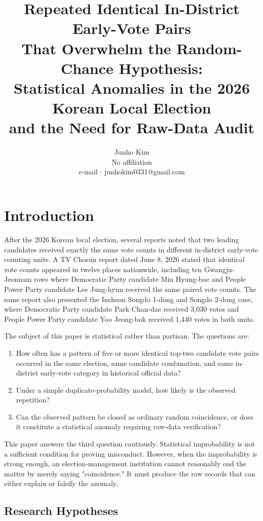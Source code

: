 \documentclass[preprint]{IEIE}
\title{Repeated Identical In-District Early-Vote Pairs\\
That Overwhelm the Random-Chance Hypothesis:\\
Statistical Anomalies in the 2026 Korean Local Election\\
and the Need for Raw-Data Audit}
\author{Junho Kim \\ No affiliation \\ e-mail : junhokim0331@gmail.com}
\makeatletter
\renewcommand{\maketitle}{
  \twocolumn[
    \begin{center}
      \vspace*{3mm}
      {\fontsize{16pt}{19.2pt}\selectfont \@title \par}
      \vspace{12mm}
      {\fontsize{10pt}{14pt}\selectfont \@author \par}
      \vspace{8mm}
    \end{center}
  ]
}
\makeatother
\begin{document}
\maketitle
\makeabstract

\section{Introduction}

After the 2026 Korean local election, several reports noted that two leading candidates received exactly the same vote counts in different in-district early-vote counting units. A TV Chosun report dated June 8, 2026 stated that identical vote counts appeared in twelve places nationwide, including ten Gwangju-Jeonnam rows where Democratic Party candidate Min Hyung-bae and People Power Party candidate Lee Jung-hyun received the same paired vote counts. The same report also presented the Incheon Songdo 1-dong and Songdo 2-dong case, where Democratic Party candidate Park Chan-dae received 3,030 votes and People Power Party candidate Yoo Jeong-bok received 1,440 votes in both units.

The subject of this paper is statistical rather than partisan. The questions are:

\begin{enumerate}
\item How often has a pattern of five or more identical top-two candidate vote pairs occurred in the same election, same candidate combination, and same in-district early-vote category in historical official data?
\item Under a simple duplicate-probability model, how likely is the observed repetition?
\item Can the observed pattern be closed as ordinary random coincidence, or does it constitute a statistical anomaly requiring raw-data verification?
\end{enumerate}

This paper answers the third question cautiously. Statistical improbability is not a sufficient condition for proving misconduct. However, when the improbability is strong enough, an election-management institution cannot reasonably end the matter by merely saying "coincidence." It must produce the raw records that can either explain or falsify the anomaly.

\subsection{Research Hypotheses}
\end{document}
